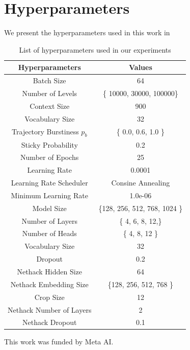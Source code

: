 \documentclass[]{fairmeta}
\begin{document}
\section{Hyperparameters}
We present the hyperparameters used in this work in 
\begin{table}[h]
    \centering
    \begin{tabular}{c c}
        \hline
\textbf{Hyperparameters} & \textbf{Values} \\
\hline
Batch Size & 64 \\
Number of Levels & \{ 10000, 30000, 100000\} \\
Context Size & 900 \\
Vocabulary Size & 32 \\
Trajectory Burstiness $p_b$ & \{ 0.0, 0.6, 1.0 \} \\
Sticky Probability & 0.2 \\
Number of Epochs & 25 \\
Learning Rate & 0.0001 \\
Learning Rate Scheduler & Consine Annealing \\
Minimum Learning Rate & 1.0e-06 \\
Model Size & \{128, 256, 512, 768, 1024 \} \\
Number of Layers & \{ 4, 6, 8, 12,\} \\
Number of Heads & \{ 4, 8, 12 \} \\
Vocabulary Size & 32 \\
Dropout & 0.2 \\
Nethack Hidden Size & 64 \\
Nethack Embedding Size & \{128, 256, 512, 768 \} \\
Crop Size & 12 \\
Nethack Number of Layers & 2 \\
Nethack Dropout & 0.1 \\
\hline
    \end{tabular}
    \caption{List of hyperparameters used in our experiments}
    \label{tab:hps}
\end{table}
This work was funded by Meta AI.
\end{document}
